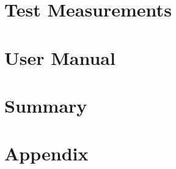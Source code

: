 \documentclass[12pt]{article}
\begin{document}
	\section{Test Measurements}
	
	\section{User Manual}
	
	\section{Summary}
	
	\begin{thebibliography}{9}
	\end{thebibliography}
	
	\appendix
	\section{Appendix}
	
\end{document}

